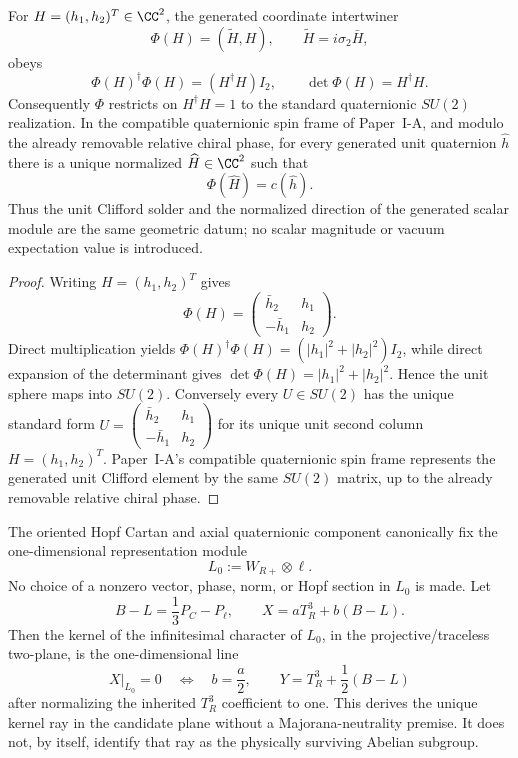 \documentclass[12pt,a4paper]{article}
\begin{document}



\begin{theorem}
\label{p5:thm:v377-unit-solder-normalized-scalar}
For \(H=(h_1,h_2)^T\in\CC^2\), the generated coordinate intertwiner
\[
 \Phi(H)=(\widetilde H,H),\qquad
 \widetilde H=i\sigma_2\bar H,
\]
obeys
\[
 \boxed{\Phi(H)^\dagger\Phi(H)=(H^\dagger H)I_2},
 \qquad
 \boxed{\det\Phi(H)=H^\dagger H}.
\]
Consequently \(\Phi\) restricts on \(H^\dagger H=1\) to the standard
quaternionic \(SU(2)\) realization.  In the compatible quaternionic spin
frame of Paper~I-A, and modulo the already removable relative chiral phase,
for every generated unit quaternion \(\hat h\) there is a unique normalized
\(\widehat H\in\CC^2\) such that
\[
 \boxed{\Phi(\widehat H)=c(\hat h).}
\]
Thus the unit Clifford solder and the normalized direction of the generated
scalar module are the same geometric datum; no scalar magnitude or vacuum
expectation value is introduced.
\end{theorem}

\begin{proof}
Writing \(H=(h_1,h_2)^T\) gives
\[
 \Phi(H)=
 \begin{pmatrix}
  \bar h_2 & h_1\\
  -\bar h_1 & h_2
 \end{pmatrix}.
\]
Direct multiplication yields
\(\Phi(H)^\dagger\Phi(H)=(|h_1|^2+|h_2|^2)I_2\), while direct expansion of
the determinant gives \(\det\Phi(H)=|h_1|^2+|h_2|^2\).  Hence the unit sphere
maps into \(SU(2)\).  Conversely every \(U\in SU(2)\) has the unique standard
form
\(
U=\left(\begin{smallmatrix}\bar h_2&h_1\\-\bar h_1&h_2\end{smallmatrix}\right)
\)
for its unique unit second column \(H=(h_1,h_2)^T\).  Paper~I-A's compatible
quaternionic spin frame represents the generated unit Clifford element by the
same \(SU(2)\) matrix, up to the already removable relative chiral phase.
\end{proof}

\begin{theorem}
\label{p5:thm:exact-oriented-vector-hypercharge}
The oriented Hopf Cartan and axial quaternionic component canonically fix the
one-dimensional representation module
\[
 L_0:=W_{R+}\otimes\ell .
\]
No choice of a nonzero vector, phase, norm, or Hopf section in \(L_0\) is
made.  Let
\[
 B-L=\frac13P_C-P_\ell,\qquad
 X=aT_R^3+b(B-L).
\]
Then the kernel of the infinitesimal character of \(L_0\), in the
projective/traceless two-plane, is the one-dimensional line
\[
 X|_{L_0}=0
 \quad\Longleftrightarrow\quad
 b=\frac a2,
 \qquad
 Y=T_R^3+\frac12(B-L)
\]
after normalizing the inherited \(T_R^3\) coefficient to one.  This derives
the unique kernel ray in the candidate plane without a Majorana-neutrality
premise.  It does not, by itself, identify that ray as the physically
surviving Abelian subgroup.
\end{theorem}
\end{document}
